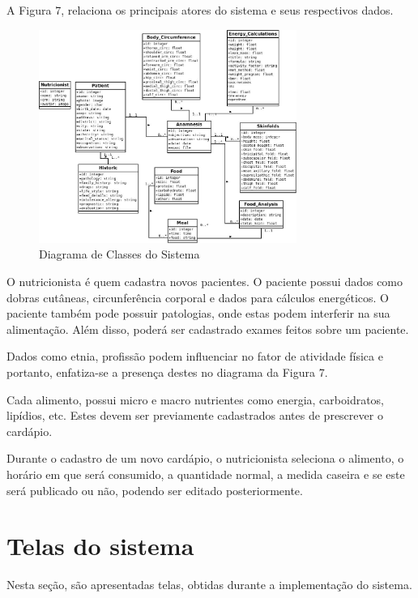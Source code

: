 \documentclass[
	12pt,				%
    oneside,			%
	a4paper,			%
	english,			%
	french,				%
	spanish,			%
	brazil,				%
	]{abntex2}
\begin{document}
A Figura 7, relaciona os principais atores do sistema e seus respectivos dados.

\begin{figure} [hbt] 
\label{diagClass1} 
\caption{Diagrama de Classes do Sistema}
\begin{center}
\includegraphics[width=0.75\textwidth]{bd-sistema.jpeg}
\end{center}
\end{figure}

O nutricionista é quem cadastra novos pacientes. O paciente possui dados como
dobras cutâneas, circunferência corporal e dados para cálculos energéticos. O
paciente também pode possuir patologias, onde estas podem interferir na sua
alimentação. Além disso, poderá ser cadastrado exames feitos sobre um paciente. 

Dados como etnia, profissão podem influenciar no fator de atividade física e portanto,
enfatiza-se a presença destes no diagrama da Figura 7.

Cada alimento, possui micro e macro nutrientes como energia, carboidratos,
lipídios, etc. Estes devem ser previamente cadastrados antes de prescrever o
cardápio.

Durante o cadastro de um novo cardápio, o nutricionista seleciona o alimento,
o horário em que será consumido, a quantidade normal, a medida caseira e se este
será publicado ou não, podendo ser editado posteriormente.

\section{Telas do sistema}

Nesta seção, são apresentadas telas, obtidas durante a implementação do sistema.
\end{document}
